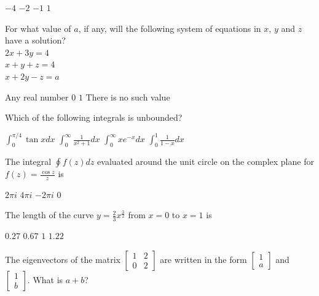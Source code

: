 \documentclass[addpoints,11pt]{exam}
\begin{document}
\begin{questions}
    \begin{oneparchoices}
        \choice $-4$
        \choice $-2$
        \choice $-1$
        \choice $1$
    \end{oneparchoices}
    \question For what value of $a$, if any, will the following system of equations in $x$, $y$ and $z$ have a solution?\\
    $2x+3y=4$\\$x+y+z=4$\\$x+2y-z=a$

        \begin{oneparchoices}
            \choice Any real number
            \choice $0$
            \choice $1$
            \choice There is no such value
        \end{oneparchoices}
        \question Which of the following integrals is unbounded?

        \begin{oneparchoices}
            \choice $\int_{0}^{\pi/4}{\tan x dx}$
            \choice $\int_{0}^{\infty}{\frac{1}{x^2+1} dx}$
            \choice $\int_{0}^{\infty}{xe^{-x} dx}$
            \choice $\int_{0}^{1}{\frac{1}{1-x} dx}$
        \end{oneparchoices}

        \question The integral $\oint{f(z)dz}$ evaluated around the unit circle on the complex plane for $f(z) = \frac{\cos z}{z}$ is

        \begin{oneparchoices}
            \choice $2\pi i$
            \choice $4\pi i$
            \choice $-2\pi i$
            \choice $0$
        \end{oneparchoices}

        \question The length of the curve $y=\frac{2}{3}x^{\frac{3}{2}}$ from $x=0$ to $x=1$ is

        \begin{oneparchoices}
            \choice $0.27$
            \choice $0.67$
            \choice $1$
            \choice $1.22$
        \end{oneparchoices}

        \question The eigenvectors of the matrix $\begin{bmatrix}
        1 & 2 \\
        0 & 2
    \end{bmatrix}$ are written in the form $\begin{bmatrix}
        1 \\
        a
    \end{bmatrix}$ and $\begin{bmatrix}
        1 \\b
    \end{bmatrix}$. What is $a+b$?


\end{questions}
\end{document}
